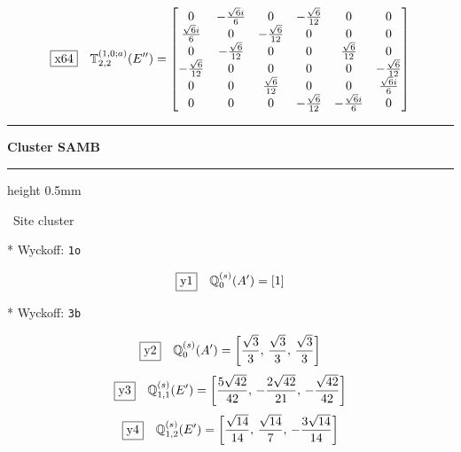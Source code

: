 \documentclass[fleqn,10pt,landscape]{jsarticle}
\begin{document}
\begin{dmath*}
\fbox{x64}\quad \mathbb{T}_{2,2}^{(1,0;a)}(E^{\prime\prime})=\begin{bmatrix} 0 & - \frac{\sqrt{6} i}{6} & 0 & - \frac{\sqrt{6}}{12} & 0 & 0 \\ \frac{\sqrt{6} i}{6} & 0 & - \frac{\sqrt{6}}{12} & 0 & 0 & 0 \\ 0 & - \frac{\sqrt{6}}{12} & 0 & 0 & \frac{\sqrt{6}}{12} & 0 \\ - \frac{\sqrt{6}}{12} & 0 & 0 & 0 & 0 & - \frac{\sqrt{6}}{12} \\ 0 & 0 & \frac{\sqrt{6}}{12} & 0 & 0 & \frac{\sqrt{6} i}{6} \\ 0 & 0 & 0 & - \frac{\sqrt{6}}{12} & - \frac{\sqrt{6} i}{6} & 0 \end{bmatrix}
\end{dmath*}
\vspace{5mm}
\noindent \rule[0.5mm]{5mm}{0.5mm}\hspace{3mm}\textbf{Cluster SAMB}\hspace{3mm}\leaders\hrule height 0.5mm\hfill\kern0pt
\vspace{3mm}

\noindent\textbullet\, Site cluster

\vspace{5mm}

\noindent ** Wyckoff: \texttt{1o}

\begin{dmath*}
\fbox{y1}\quad \mathbb{Q}_{0}^{(s)}(A^{\prime})=\left[ 1 \right]
\end{dmath*}
\vspace{5mm}

\noindent ** Wyckoff: \texttt{3b}

\begin{dmath*}
\fbox{y2}\quad \mathbb{Q}_{0}^{(s)}(A^{\prime})=\left[ \frac{\sqrt{3}}{3},\, \frac{\sqrt{3}}{3},\, \frac{\sqrt{3}}{3} \right]
\end{dmath*}
\begin{dmath*}
\fbox{y3}\quad \mathbb{Q}_{1,1}^{(s)}(E^{\prime})=\left[ \frac{5 \sqrt{42}}{42},\, - \frac{2 \sqrt{42}}{21},\, - \frac{\sqrt{42}}{42} \right]
\end{dmath*}
\begin{dmath*}
\fbox{y4}\quad \mathbb{Q}_{1,2}^{(s)}(E^{\prime})=\left[ \frac{\sqrt{14}}{14},\, \frac{\sqrt{14}}{7},\, - \frac{3 \sqrt{14}}{14} \right]
\end{dmath*}
\vspace{5mm}
\end{document}
